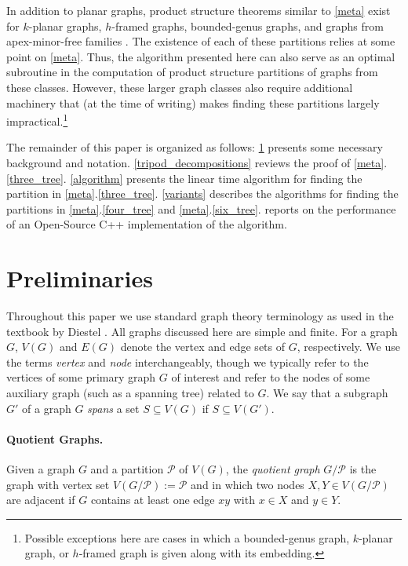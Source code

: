 \documentclass{patmorin}
\begin{document}
In addition to planar graphs, product structure theorems similar to \cref{meta} exist for $k$-planar graphs, $h$-framed graphs, bounded-genus graphs, and graphs from apex-minor-free families \cite{dujmovic.joret.ea:planar,dujmovic.morin.ea:graph,bekos.dalozzo.ea:graph}.  The existence of each of these partitions relies at some point on \cref{meta}.  Thus, the algorithm presented here can also serve as an optimal subroutine in the computation of product structure partitions of graphs from these classes.  However, these larger graph classes also require additional machinery that (at the time of writing) makes finding these partitions largely impractical.\footnote{Possible exceptions here are cases in which a bounded-genus graph, $k$-planar graph, or $h$-framed graph is given along with its embedding.}

The remainder of this paper is organized as follows: \cref{prelims} presents some necessary background and notation.  \cref{tripod_decompositions} reviews the proof of \cref{meta}.\ref{three_tree}.  \cref{algorithm} presents the linear time algorithm for finding the partition in \cref{meta}.\ref{three_tree}.  \cref{variants} describes the algorithms for finding the partitions in \cref{meta}.\ref{four_tree} and \cref{meta}.\ref{six_tree}.   reports on the performance of an Open-Source C++ implementation of the algorithm.

\section{Preliminaries}
\label{prelims}

Throughout this paper we use standard graph theory terminology as used in the textbook by Diestel \cite{diestel:graph}.  All graphs discussed here are simple and finite.  For a graph $G$, $V(G)$ and $E(G)$ denote the vertex and edge sets of $G$, respectively.  We use the terms \emph{vertex} and \emph{node} interchangeably, though we typically refer to the vertices of some primary graph $G$ of interest and refer to the nodes of some auxiliary graph (such as a spanning tree) related to $G$.  We say that a subgraph $G'$ of a graph $G$ \emph{spans} a set $S\subseteq V(G)$ if $S\subseteq V(G')$.


\paragraph*{Quotient Graphs.}

Given a graph $G$ and a partition $\mathcal{P}$ of $V(G)$, the \emph{quotient graph} $G/\mathcal{P}$ is the graph with vertex set $V(G/\mathcal{P}):=\mathcal{P}$ and in which two nodes $X,Y\in V(G/\mathcal{P})$ are adjacent if $G$ contains at least one edge $xy$ with $x\in X$ and $y\in Y$.
\end{document}
